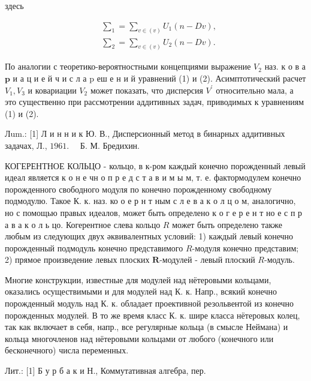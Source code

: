 \documentclass[10pt]{article}
\begin{document}
здесь



\[

\begin{aligned}

& \sum_{1}=\sum_{v \in(v)} U_{1}(n-D v), \\

& \sum_{2}=\sum_{v \in(v)} U_{2}(n-D v) .

\end{aligned}

\]



По аналогии с теоретико-вероятностными концепциями выражение $V_{2}$ наз. к о в а $\mathbf{p}$ и а ц и е й ч и с л а $\mathrm{p}$ еш е н и й уравнений (1) и (2). Асимптотический расчет $V_{1}, V_{3}$ и ковариации $V_{2}$ может показать, что дисперсия $V^{\prime}$ относительно мала, а это существенно при рассмотрении аддитивных задач, приводимых к уравнениям (1) и (2).



Лum.: [1] Л и н н и к Ю. В., Дисперсионный метод в бинарных аддитивных задачах, Л., $1961 . \quad$ Б. М. Бредихин.



КОГЕРЕНТНОЕ КОЛЬЦО - кольцо, в к-ром каждый конечно порожденный левый идеал является к о н е чн о п р е д с т а в и м ы м, т. е. фактормодулем конечно порожденного свободного модуля по конечно порожденному свободному подмодулю. Такое К. к. наз. ко о е р н т ным с л е в а к о л ц о м, аналогично, но с помощью правых идеалов, может быть определено к о г е р е н т но е с п р а в а к о л ь цо. Когерентное слева кольцо $R$ может быть определено также любым из следующих двух әквивалентных условий: 1) каждый левый конечно порожденный подмодуль конечно представимого $R$-модуля конечно представим; 2) прямое произведение левых плоских $\boldsymbol{R}$-модулей - левый плоский $R$-модуль.



Многие конструкции, известные для модулей над нётеровыми кольцами, оказались осуществимыми и для модулей над К. к. Напр., всякий конечно порожденный модуль над К. к. обладает проективной резольвентой из конечно порожденных модулей. В то же время класс К. к. шире класса нётеровых колец, так как включает в себя, напр., все регулярные кольца (в смысле Неймана) и кольца многочленов над нётеровыми кольцами от любого (конечного или бесконечного) числа переменных.



Лит.: [1] Б у р б а к и Н., Коммутативная алгебра, пер.
\end{document}
